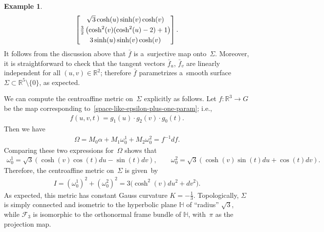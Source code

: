 \documentclass[10pt,a4paper]{amsart}
\numberwithin{equation}{section}
\theoremstyle{definition}
\newtheorem{exmpl}[teo]{Example}
\begin{document}
\begin{exmpl}
\begin{gather}
\begin{bmatrix}
\sqrt{3} \cosh(u) \sinh(v) \cosh(v)
\vspace{1mm}\\
\tfrac{3}{2}\left(\cosh^2(v) (\cosh^2(u) - 2) + 1 \right)
\vspace{1mm}\\
3 \sinh(u) \sinh(v) \cosh(v)
\end{bmatrix}.
\label{space-like-epsilon-plus-one-param}
\end{gather}
It follows from the discussion above that $\bar{f}$ is a~surjective map onto~$\Sigma$.
Moreover, it is straightforward to check that the tangent vectors $\bar{f}_u$, $\bar{f}_v$ are linearly independent for
all $(u,v) \in \mathbb{R}^2$; therefore $\bar{f}$ parametrizes a~smooth surface $\Sigma \subset \mathbb{R}^5 \setminus
\{0 \}$, as expected.

We can compute the centroaf\/f\/ine metric on~$\Sigma$ explicitly as follows.
Let $f:\mathbb{R}^3 \to G$ be the map corresponding to~\eqref{space-like-epsilon-plus-one-param}; i.e.,
\begin{gather*}
f(u,v,t) = g_1(u) \cdot g_2(v) \cdot g_0(t).
\end{gather*}
Then we have
\begin{gather*}
\Omega = M_0  \alpha + M_1  \omega^1_0 + M_2  \omega^2_0 = f^{-1}  df.
\end{gather*}
Comparing these two expressions for~$\Omega$ shows that
\begin{gather*}
\omega^1_0 = \sqrt{3}\left(\cosh (v) \cos(t)   du - \sin(t)  dv \right),
\qquad
\omega^2_0 = \sqrt{3}\left(\cosh (v) \sin(t)  du + \cos(t)  dv \right).
\end{gather*}
Therefore, the centroaf\/f\/ine metric on~$\Sigma$ is given~by
\begin{gather*}
I = \left(\omega^1_0\right)^2 + \left(\omega^2_0\right)^2 = 3\big(\cosh^2(v)  du^2 + dv^2\big).
\end{gather*}
As expected, this metric has constant Gauss curvature $K = -\frac{1}{3}$.
Topologically, $\Sigma$ is simply connected and isometric to the hyperbolic plane $\mathbb{H}$ of ``radius'' $\sqrt{3}$,
while $\mathcal{F}_3$ is isomorphic to the orthonormal frame bundle of $\mathbb{H}$, with~$\pi$ as the projection map.


\end{exmpl}
\end{document}
